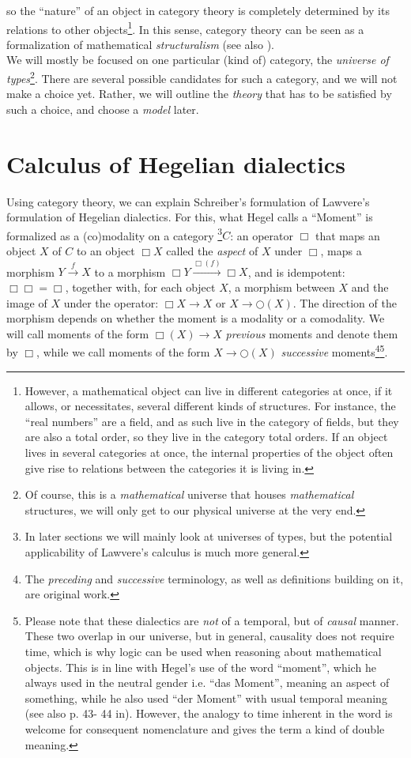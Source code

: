 \documentclass{article}
\begin{document}
so the ``nature'' of an object in category theory is completely determined by its relations to other objects\footnote{However,
a mathematical object can live in different categories at once, if it allows, or necessitates, several
different kinds of structures. For instance, the ``real numbers'' are a field, and as such live in the
category of fields, but they are also a total order, so they live in the category total orders. If an
object lives in several categories at once, the internal properties of the object often give rise to relations
between the categories it is living in.}. In this sense, category theory can be seen as a formalization
of mathematical \emph{structuralism} (see also \cite{Ad03}). \\

We will mostly be focused on one particular (kind of) category, the \emph{universe of types}\footnote{Of
course, this is a \emph{mathematical} universe that houses \emph{mathematical} structures, we will only
get to our physical universe at the very end.}. There are several possible candidates for such a category,
and we will not make a choice yet. Rather, we will outline the \emph{theory} that has to be satisfied
by such a choice, and choose a \emph{model} later.


\section{Calculus of Hegelian dialectics}
Using category theory, we can explain Schreiber's formulation of Lawvere's formulation of Hegelian dialectics.
For this, what Hegel calls a ``Moment'' is formalized as a (co)modality on a category \footnote{In later
sections we will mainly look at universes of types, but the potential applicability of Lawvere's calculus
is much more general.}$C$: an operator $\Box$ that maps an object $X$ of $C$ to an object $\Box X$ called
the \emph{aspect} of $X$ under $\Box$, maps a morphism $Y\xrightarrow{f} X$ to a morphism $\Box Y\xrightarrow{\Box(f)}\Box
X$, and is idempotent: $\Box\Box =\Box$, together with, for each object $X$, a morphism between $X$ and
the image of $X$ under the operator: $\Box X\rightarrow X$ or $X\rightarrow \bigcirc(X)$. The direction
of the morphism depends on whether the moment is a modality or a comodality. We will call moments of the
form $\Box(X)\rightarrow X$ \emph{previous} moments and denote them by $\Box$, while we call moments of
the form $X\rightarrow \bigcirc(X)$ \emph{successive} moments\footnote{The \emph{preceding} and \emph{successive}
terminology, as well as definitions building on it, are original work.}\footnote{Please note that these
dialectics are \emph{not} of a temporal, but of \emph{causal} manner. These two overlap in our universe,
but in general, causality does not require time, which is why logic can be used when reasoning about mathematical
objects. This is in line with Hegel's use of the word  ``moment'', which he always used in the neutral
gender i.e. ``das Moment'', meaning an aspect of something, while he also used ``der Moment'' with usual
temporal meaning (see also p. 43- 44 in\cite{Kli}). However, the analogy to time inherent in the word
is welcome for consequent nomenclature and gives the term a kind of double meaning.}.
\end{document}
